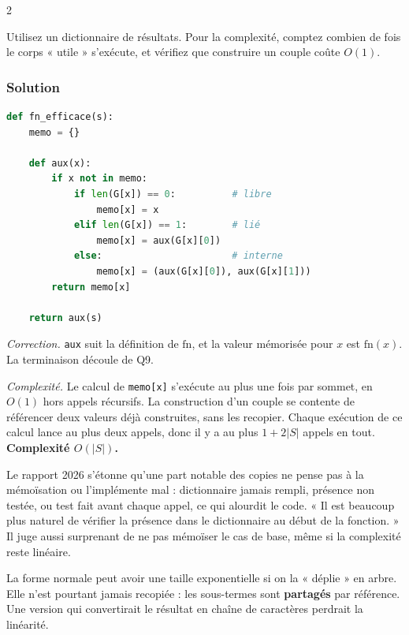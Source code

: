 \documentclass[11pt,a4paper]{article}
\begin{document}
\begin{indication}{2}

Utilisez un dictionnaire de résultats. Pour la complexité, comptez combien de fois le corps « utile » s'exécute, et vérifiez que construire un couple coûte \(O(1)\).

\end{indication}

\hypertarget{solution-10}{%
\subsubsection{Solution}\label{solution-10}}

\begin{lstlisting}[language=Python]
def fn_efficace(s):
    memo = {}

    def aux(x):
        if x not in memo:
            if len(G[x]) == 0:          # libre
                memo[x] = x
            elif len(G[x]) == 1:        # lié
                memo[x] = aux(G[x][0])
            else:                       # interne
                memo[x] = (aux(G[x][0]), aux(G[x][1]))
        return memo[x]

    return aux(s)
\end{lstlisting}

\emph{Correction.} \texttt{aux} suit la définition de \(\mathrm{fn}\), et la valeur mémorisée pour \(x\) est \(\mathrm{fn}(x)\). La terminaison découle de Q9.

\emph{Complexité.} Le calcul de \texttt{memo{[}x{]}} s'exécute au plus une fois par sommet, en \(O(1)\) hors appels récursifs. La construction d'un couple se contente de référencer deux valeurs déjà construites, sans les recopier. Chaque exécution de ce calcul lance au plus deux appels, donc il y a au plus \(1+2|S|\) appels en tout. \textbf{Complexité \(O(|S|)\).}

\begin{jury}

Le rapport 2026 s'étonne qu'une part notable des copies ne pense pas à la mémoïsation ou l'implémente mal : dictionnaire jamais rempli, présence non testée, ou test fait avant chaque appel, ce qui alourdit le code. « Il est beaucoup plus naturel de vérifier la présence dans le dictionnaire au début de la fonction. » Il juge aussi surprenant de ne pas mémoïser le cas de base, même si la complexité reste linéaire.

\end{jury}

\begin{piege}

La forme normale peut avoir une taille exponentielle si on la « déplie » en arbre. Elle n'est pourtant jamais recopiée : les sous-termes sont \textbf{partagés} par référence. Une version qui convertirait le résultat en chaîne de caractères perdrait la linéarité.

\end{piege}
\end{document}
